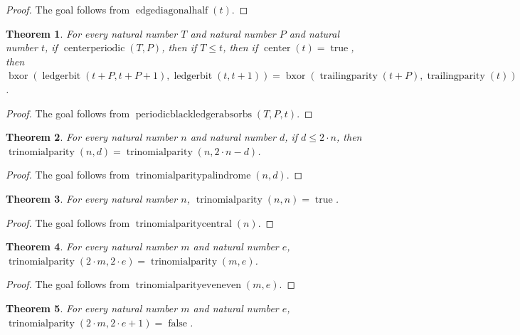 \documentclass[11pt]{article}
\newtheorem{theorem}{Theorem}[section]
\theoremstyle{definition}
\begin{document}
\begin{proof}
The goal follows from \(\operatorname{edgediagonalhalf}(t)\).
\end{proof}
\begin{theorem}
\label{ll:observations:periodic-black-ledger-absorbs}
For every natural number \(T\) and natural number \(P\) and natural number \(t\), if \(\operatorname{centerperiodic}(T, P)\), then if \(T \le t\), then if \(\operatorname{center}(t) = \operatorname{true}\), then \(\operatorname{bxor}(\operatorname{ledgerbit}(t + P, t + P + 1), \operatorname{ledgerbit}(t, t + 1)) = \operatorname{bxor}(\operatorname{trailingparity}(t + P), \operatorname{trailingparity}(t))\).
\end{theorem}
\begin{proof}
The goal follows from \(\operatorname{periodicblackledgerabsorbs}(T, P, t)\).
\end{proof}
\begin{theorem}
\label{ll:observations:trinomial-parity-palindrome}
For every natural number \(n\) and natural number \(d\), if \(d \le 2 \cdot n\), then \(\operatorname{trinomialparity}(n, d) = \operatorname{trinomialparity}(n, 2 \cdot n - d)\).
\end{theorem}
\begin{proof}
The goal follows from \(\operatorname{trinomialparitypalindrome}(n, d)\).
\end{proof}
\begin{theorem}
\label{ll:observations:trinomial-parity-central}
For every natural number \(n\), \(\operatorname{trinomialparity}(n, n) = \operatorname{true}\).
\end{theorem}
\begin{proof}
The goal follows from \(\operatorname{trinomialparitycentral}(n)\).
\end{proof}
\begin{theorem}
\label{ll:observations:trinomial-parity-even-even}
For every natural number \(m\) and natural number \(e\), \(\operatorname{trinomialparity}(2 \cdot m, 2 \cdot e) = \operatorname{trinomialparity}(m, e)\).
\end{theorem}
\begin{proof}
The goal follows from \(\operatorname{trinomialparityeveneven}(m, e)\).
\end{proof}
\begin{theorem}
\label{ll:observations:trinomial-parity-even-odd}
For every natural number \(m\) and natural number \(e\), \(\operatorname{trinomialparity}(2 \cdot m, 2 \cdot e + 1) = \operatorname{false}\).
\end{theorem}
\end{document}
